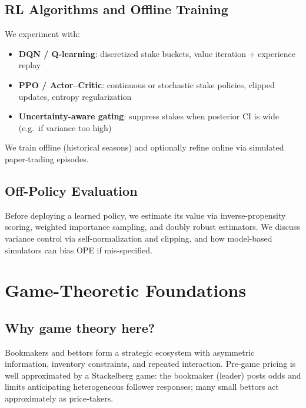 \subsection{RL Algorithms and Offline Training}
We experiment with:
\begin{itemize}
  \item \textbf{DQN / Q-learning}: discretized stake buckets, value iteration + experience replay
  \item \textbf{PPO / Actor–Critic}: continuous or stochastic stake policies, clipped updates, entropy regularization
  \item \textbf{Uncertainty-aware gating}: suppress stakes when posterior CI is wide (e.g.\ if variance too high)
\end{itemize}
We train offline (historical seasons) and optionally refine online via simulated paper-trading episodes.

\subsection{Off-Policy Evaluation}
Before deploying a learned policy, we estimate its value via inverse-propensity scoring, weighted importance sampling, and doubly robust estimators. We discuss variance control via self-normalization and clipping, and how model-based simulators can bias OPE if mis-specified.

\section{Game-Theoretic Foundations}
\label{sec:game-theory}
\subsection{Why game theory here?}
\begingroup\sloppy
Bookmakers and bettors form a strategic ecosystem with asymmetric information, inventory constraints, and repeated interaction. Pre‑game pricing is well approximated by a Stackelberg game: the bookmaker (leader) posts odds and limits anticipating heterogeneous follower responses; many small bettors act approximately as price‑takers.

